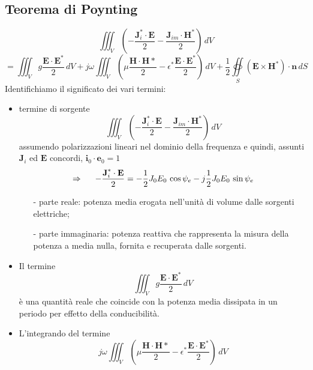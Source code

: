 \documentclass[a4paper]{article}
\let\oldoiint\oiint
\renewcommand{\oiint}{\oldoiint\limits}
\begin{document}
\subsection*{Teorema di Poynting}
\begin{equation*}
\iiint_V(-\frac{\textbf{J}_i^*\cdot\textbf{E}}{2}-\frac{\textbf{J}_{im}\cdot\textbf{H}^*}{2})\,dV
\end{equation*}
\begin{equation*}
=\iiint_Vg\frac{\textbf{E}\cdot\textbf{E}^*}{2}\,dV+j\omega\iiint_V(\mu\frac{\textbf{H}\cdot\textbf{H}*}{2}-\epsilon^*\frac{\textbf{E}\cdot\textbf{E}^*}{2})\,dV+\frac{1}{2}\oiint_S(\textbf{E}\times\textbf{H}^*)\cdot\textbf{n}\,dS
\end{equation*}
Identifichiamo il significato dei vari termini:
\begin{itemize}
\item termine di sorgente
\begin{equation*}
\iiint_V(-\frac{\textbf{J}_i^*\cdot\textbf{E}}{2}-\frac{\textbf{J}_{im}\cdot\textbf{H}^*}{2})\,dV
\end{equation*}
assumendo polarizzazioni lineari nel dominio della frequenza e quindi, assunti $\textbf{J}_i$ ed $\textbf{E}$ concordi, $\textbf{i}_0\cdot\textbf{e}_0=1$
\begin{equation*}
\Rightarrow\hspace{5mm}-\frac{\textbf{J}_i^*\cdot\textbf{E}}{2}=-\frac{1}{2}J_0E_0\,\cos\psi_e-j\frac{1}{2}J_0E_0\,\sin\psi_e
\end{equation*}
\begin{itemize}
\item[-] parte reale: potenza media erogata nell'unità di volume dalle sorgenti elettriche;
\item[-] parte immaginaria: potenza reattiva che rappresenta la misura della potenza a media nulla, fornita e recuperata dalle sorgenti.
\end{itemize}
\item Il termine
\begin{equation*}
\iiint_Vg\frac{\textbf{E}\cdot\textbf{E}^*}{2}\,dV
\end{equation*}
è una quantità reale che coincide con la potenza media dissipata in un periodo per effetto della conducibilità.
\item L'integrando del termine
\begin{equation*}
j\omega\iiint_V(\mu\frac{\textbf{H}\cdot\textbf{H}*}{2}-\epsilon^*\frac{\textbf{E}\cdot\textbf{E}^*}{2})\,dV
\end{equation*}

\end{itemize}
\end{document}
